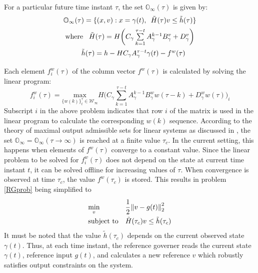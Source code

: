 \documentclass[letterpaper, 10 pt, conference]{ieeeconf}  %
\newcommand{\norm}[1]{\left\lVert#1\right\rVert}
\begin{document}
\begin{enumerate}
	For a particular future time instant $\tau$, the set $\mathbb{O}_{\infty}(\tau)$ is given by:
	\begin{equation*}
	\begin{matrix}
	\mathbb{O}_{\infty}(\tau) = \{(x,v): x = \gamma(t), \hspace{5pt} \tilde{H}(\tau)v \leq \tilde{h}(\tau)\} \vspace{5pt}\\
	\text{where } \hspace{5pt} \tilde{H}(\tau) = H\bigg( C_{\gamma}\sum\limits_{k=1}^{\tau - t}A_{\gamma}^{k-1}B^v_{\gamma} + D_{\gamma}^v \bigg) \vspace{5pt} \\ \hspace{10pt}
	\tilde{h}(\tau) = h - HC_{\gamma}A_{\gamma}^{\tau - t}\gamma(t) - f^w(\tau) \vspace{5pt}
	\end{matrix} 
	\end{equation*}
	Each element $f^w_i(\tau)$ of the column vector $f^w(\tau)$ is calculated by solving the linear program:
	\begin{equation}
	f_i^w(\tau) = \underset{\{w(k)\}_{t}^{\tau}\in \mathcal{W}_{\infty}}{\text{max}} H\bigg(C_{\gamma}\sum\limits_{k=1}^{\tau - t}A_{\gamma}^{k-1}B^w_{\gamma}w(\tau-k) + D_{\gamma}^w w(\tau)\bigg)_i
	\label{RG_offline}
	\end{equation}
	Subscript $i$ in the above problem indicates that row $i$ of the matrix is used in the linear program to calculate the corresponding $w(k)$ sequence. According to the theory of maximal output admissible sets for linear systems as discussed in \cite{83532}, the set $\mathbb{O}_{\infty} = \mathbb{O}_{\infty}(\tau \to \infty)$ is reached at a finite value $\tau_c$. In the current setting, this happens when elements of $f^w(\tau)$ converge to a constant value. Since the linear problem to be solved for $f_i^w(\tau)$ does not depend on the state at current time instant $t$, it can be solved offline for increasing values of $\tau$. When convergence is observed at time $\tau_c$, the value $f^w(\tau_c)$ is stored. This results in  problem \eqref{RGprob} being simplified to
	\begin{equation}
	\begin{aligned}
	& \underset{v}{\text{min}}
	& & \cfrac{1}{2}\norm{v-g(t)}_2^2 \\
	& \text{subject to}
	& & 
	\tilde{H}(\tau_c)v \leq \tilde{h}(\tau_c)
	\end{aligned}
	\label{RGprob_simple}
	\end{equation}
	It must be noted that the value $\tilde{h}(\tau_c)$ depends on the current observed state $\gamma(t)$. Thus, at each time instant, the reference governer reads the current state $\gamma(t)$, reference input $g(t)$, and calculates a new reference $v$ which robustly satisfies output constraints on the system.
	

\end{enumerate}
\end{document}

